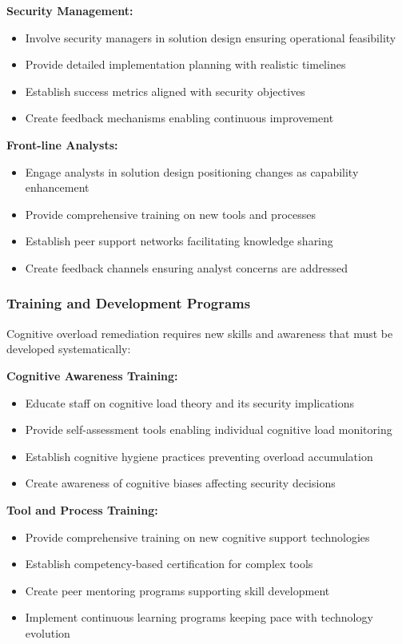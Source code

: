 \documentclass[11pt,a4paper]{article}
\begin{document}
\textbf{Security Management:}
\begin{itemize}
\item Involve security managers in solution design ensuring operational feasibility
\item Provide detailed implementation planning with realistic timelines
\item Establish success metrics aligned with security objectives
\item Create feedback mechanisms enabling continuous improvement
\end{itemize}

\textbf{Front-line Analysts:}
\begin{itemize}
\item Engage analysts in solution design positioning changes as capability enhancement
\item Provide comprehensive training on new tools and processes
\item Establish peer support networks facilitating knowledge sharing
\item Create feedback channels ensuring analyst concerns are addressed
\end{itemize}

\subsubsection{Training and Development Programs}

Cognitive overload remediation requires new skills and awareness that must be developed systematically:

\textbf{Cognitive Awareness Training:}
\begin{itemize}
\item Educate staff on cognitive load theory and its security implications
\item Provide self-assessment tools enabling individual cognitive load monitoring
\item Establish cognitive hygiene practices preventing overload accumulation
\item Create awareness of cognitive biases affecting security decisions
\end{itemize}

\textbf{Tool and Process Training:}
\begin{itemize}
\item Provide comprehensive training on new cognitive support technologies
\item Establish competency-based certification for complex tools
\item Create peer mentoring programs supporting skill development
\item Implement continuous learning programs keeping pace with technology evolution
\end{itemize}
\end{document}
